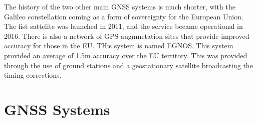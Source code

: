 The history of the two other main GNSS systems is much shorter, with the Galileo constellation coming as a form of sovereignty for the European Union. The fist sattelite
was launched in 2011, and the service became operational in 2016. There is also a network of GPS augmnetation sites that provide improved accuracy for those in the EU.
THis system is named EGNOS. This system provided an average of 1.5m accuracy over the EU territory. This was provided through the use of ground stations and a
geostationary satellite broadcasting the timing corrections. 


\section{GNSS Systems} \label{sec:GNSS}
